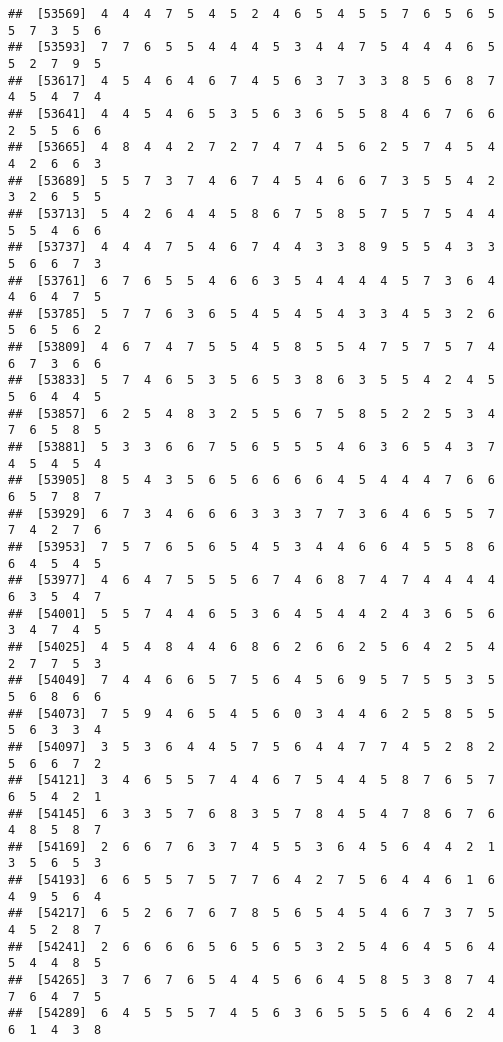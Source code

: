 \documentclass[
]{book}
\begin{document}
\begin{verbatim}
##  [53569]  4  4  4  7  5  4  5  2  4  6  5  4  5  5  7  6  5  6  5  5  7  3  5  6
##  [53593]  7  7  6  5  5  4  4  4  5  3  4  4  7  5  4  4  4  6  5  5  2  7  9  5
##  [53617]  4  5  4  6  4  6  7  4  5  6  3  7  3  3  8  5  6  8  7  4  5  4  7  4
##  [53641]  4  4  5  4  6  5  3  5  6  3  6  5  5  8  4  6  7  6  6  2  5  5  6  6
##  [53665]  4  8  4  4  2  7  2  7  4  7  4  5  6  2  5  7  4  5  4  4  2  6  6  3
##  [53689]  5  5  7  3  7  4  6  7  4  5  4  6  6  7  3  5  5  4  2  3  2  6  5  5
##  [53713]  5  4  2  6  4  4  5  8  6  7  5  8  5  7  5  7  5  4  4  5  5  4  6  6
##  [53737]  4  4  4  7  5  4  6  7  4  4  3  3  8  9  5  5  4  3  3  5  6  6  7  3
##  [53761]  6  7  6  5  5  4  6  6  3  5  4  4  4  4  5  7  3  6  4  4  6  4  7  5
##  [53785]  5  7  7  6  3  6  5  4  5  4  5  4  3  3  4  5  3  2  6  5  6  5  6  2
##  [53809]  4  6  7  4  7  5  5  4  5  8  5  5  4  7  5  7  5  7  4  6  7  3  6  6
##  [53833]  5  7  4  6  5  3  5  6  5  3  8  6  3  5  5  4  2  4  5  5  6  4  4  5
##  [53857]  6  2  5  4  8  3  2  5  5  6  7  5  8  5  2  2  5  3  4  7  6  5  8  5
##  [53881]  5  3  3  6  6  7  5  6  5  5  5  4  6  3  6  5  4  3  7  4  5  4  5  4
##  [53905]  8  5  4  3  5  6  5  6  6  6  6  4  5  4  4  4  7  6  6  6  5  7  8  7
##  [53929]  6  7  3  4  6  6  6  3  3  3  7  7  3  6  4  6  5  5  7  7  4  2  7  6
##  [53953]  7  5  7  6  5  6  5  4  5  3  4  4  6  6  4  5  5  8  6  6  4  5  4  5
##  [53977]  4  6  4  7  5  5  5  6  7  4  6  8  7  4  7  4  4  4  4  6  3  5  4  7
##  [54001]  5  5  7  4  4  6  5  3  6  4  5  4  4  2  4  3  6  5  6  3  4  7  4  5
##  [54025]  4  5  4  8  4  4  6  8  6  2  6  6  2  5  6  4  2  5  4  2  7  7  5  3
##  [54049]  7  4  4  6  6  5  7  5  6  4  5  6  9  5  7  5  5  3  5  5  6  8  6  6
##  [54073]  7  5  9  4  6  5  4  5  6  0  3  4  4  6  2  5  8  5  5  5  6  3  3  4
##  [54097]  3  5  3  6  4  4  5  7  5  6  4  4  7  7  4  5  2  8  2  5  6  6  7  2
##  [54121]  3  4  6  5  5  7  4  4  6  7  5  4  4  5  8  7  6  5  7  6  5  4  2  1
##  [54145]  6  3  3  5  7  6  8  3  5  7  8  4  5  4  7  8  6  7  6  4  8  5  8  7
##  [54169]  2  6  6  7  6  3  7  4  5  5  3  6  4  5  6  4  4  2  1  3  5  6  5  3
##  [54193]  6  6  5  5  7  5  7  7  6  4  2  7  5  6  4  4  6  1  6  4  9  5  6  4
##  [54217]  6  5  2  6  7  6  7  8  5  6  5  4  5  4  6  7  3  7  5  4  5  2  8  7
##  [54241]  2  6  6  6  6  5  6  5  6  5  3  2  5  4  6  4  5  6  4  5  4  4  8  5
##  [54265]  3  7  6  7  6  5  4  4  5  6  6  4  5  8  5  3  8  7  4  7  6  4  7  5
##  [54289]  6  4  5  5  5  7  4  5  6  3  6  5  5  5  6  4  6  2  4  6  1  4  3  8

\end{verbatim}
\end{document}
